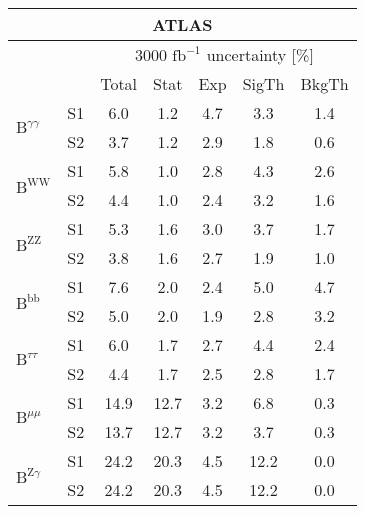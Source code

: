 \begin{tabular}{@{} l c c@{\hskip 0.15in} c c c c @{}}
  \hline
     \multicolumn{7}{c}{ATLAS}\\
 \hline
  &  & \multicolumn{5}{c}{3000 $\text{fb}^{-1}$ uncertainty [\%]} \\
  &  & Total & Stat & Exp & SigTh & BkgTh \\
  \hline
  \multirow{2}{*}{$\mathrm{B}^{\gamma\gamma}$} & S1 &6.0   & 1.2   & 4.7   & 3.3   & 1.4  \\[1pt] 
  & S2 &3.7   & 1.2   & 2.9   & 1.8   & 0.6  \\[4pt]
  \multirow{2}{*}{$\mathrm{B}^{\mathrm{WW}}$} & S1 &5.8   & 1.0   & 2.8   & 4.3   & 2.6  \\[1pt]
  & S2 &4.4   & 1.0   & 2.4   & 3.2   & 1.6  \\[4pt]
  \multirow{2}{*}{$\mathrm{B}^{\mathrm{ZZ}}$} & S1 &5.3   & 1.6   & 3.0   & 3.7   & 1.7  \\[1pt]
  & S2 &3.8   & 1.6   & 2.7   & 1.9   & 1.0  \\[4pt]
  \multirow{2}{*}{$\mathrm{B}^{\mathrm{bb}}$} & S1 &7.6   & 2.0   & 2.4   & 5.0   & 4.7  \\[1pt]
  & S2 &5.0   & 2.0   & 1.9   & 2.8   & 3.2  \\[4pt]
  \multirow{2}{*}{$\mathrm{B}^{\tau\tau }$} & S1 &6.0   & 1.7   & 2.7   & 4.4   & 2.4  \\[1pt]
  & S2 &4.4   & 1.7   & 2.5   & 2.8   & 1.7  \\[4pt]
  \multirow{2}{*}{$\mathrm{B}^{\mu\mu}$} & S1  &14.9  & 12.7  & 3.2   & 6.8   & 0.3  \\[1pt]
  & S2 &13.7  & 12.7  & 3.2   & 3.7   & 0.3  \\[4pt]
  \multirow{2}{*}{$\mathrm{B}^{\mathrm{Z}\gamma}$} & S1 &24.2  & 20.3  & 4.5   & 12.2  & 0.0  \\[1pt]
  & S2 &24.2  & 20.3  & 4.5   & 12.2  & 0.0  \\[4pt]
  \hline
\end{tabular}
